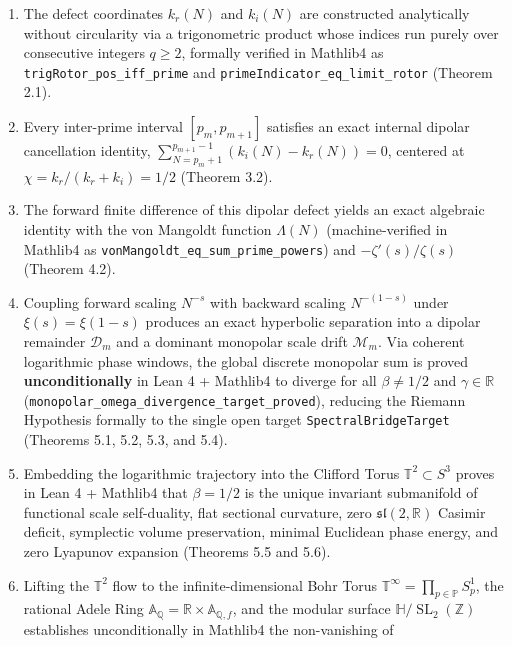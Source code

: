\documentclass[
  11pt,
]{article}
\providecommand{\tightlist}{%
  \setlength{\itemsep}{0pt}\setlength{\parskip}{0pt}}
\begin{document}
\begin{enumerate}
\def\labelenumi{\arabic{enumi}.}
\tightlist
\item
  The defect coordinates \(k_r(N)\) and \(k_i(N)\) are constructed
  analytically without circularity via a trigonometric product whose
  indices run purely over consecutive integers \(q \ge 2\), formally
  verified in Mathlib4 as \texttt{trigRotor\_pos\_iff\_prime} and
  \texttt{primeIndicator\_eq\_limit\_rotor} (Theorem 2.1).
\item
  Every inter-prime interval \([p_m, p_{m+1}]\) satisfies an exact
  internal dipolar cancellation identity,
  \(\sum_{N=p_m+1}^{p_{m+1}-1} (k_i(N) - k_r(N)) = 0\), centered at
  \(\chi = k_r / (k_r + k_i) = 1/2\) (Theorem 3.2).
\item
  The forward finite difference of this dipolar defect yields an exact
  algebraic identity with the von Mangoldt function \(\Lambda(N)\)
  (machine-verified in Mathlib4 as
  \texttt{vonMangoldt\_eq\_sum\_prime\_powers}) and
  \(-\zeta'(s)/\zeta(s)\) (Theorem 4.2).
\item
  Coupling forward scaling \(N^{-s}\) with backward scaling
  \(N^{-(1-s)}\) under \(\xi(s) = \xi(1-s)\) produces an exact
  hyperbolic separation into a dipolar remainder \(\mathcal{D}_m\) and a
  dominant monopolar scale drift \(\mathcal{M}_m\). Via coherent
  logarithmic phase windows, the global discrete monopolar sum is proved
  \textbf{unconditionally} in Lean 4 + Mathlib4 to diverge for all
  \(\beta \neq 1/2\) and \(\gamma \in \mathbb{R}\)
  (\texttt{monopolar\_omega\_divergence\_target\_proved}), reducing the
  Riemann Hypothesis formally to the single open target
  \texttt{SpectralBridgeTarget} (Theorems 5.1, 5.2, 5.3, and 5.4).
\item
  Embedding the logarithmic trajectory into the Clifford Torus
  \(\mathbb{T}^2 \subset S^3\) proves in Lean 4 + Mathlib4 that
  \(\beta = 1/2\) is the unique invariant submanifold of functional
  scale self-duality, flat sectional curvature, zero
  \(\mathfrak{sl}(2, \mathbb{R})\) Casimir deficit, symplectic volume
  preservation, minimal Euclidean phase energy, and zero Lyapunov
  expansion (Theorems 5.5 and 5.6).
\item
  Lifting the \(\mathbb{T}^2\) flow to the infinite-dimensional Bohr
  Torus \(\mathbb{T}^\infty = \prod_{p \in \mathbb{P}} S^1_p\), the
  rational Adele Ring
  \(\mathbb{A}_\mathbb{Q} = \mathbb{R} \times \mathbb{A}_{\mathbb{Q},f}\),
  and the modular surface \(\mathbb{H}/\operatorname{SL}_2(\mathbb{Z})\)
  establishes unconditionally in Mathlib4 the non-vanishing of

\end{enumerate}
\end{document}
